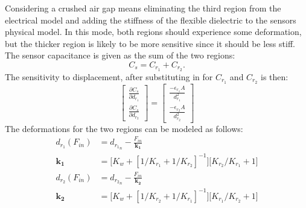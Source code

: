 Considering a crushed air gap means eliminating the third region from the electrical model
and adding the stiffness of the flexible dielectric to the sensors physical model.
In this mode, both regions should experience some deformation, but the thicker region is likely
to be more sensitive since it should be less stiff. 
The sensor capacitance is given as the sum of the two regions:
\begin{equation}
C_s = C_{r_1} + C_{r_2}.
\end{equation}
The sensitivity to displacement, after substituting in for $C_{r_1}$ and $C_{r_2}$ is then:
\begin{equation}
\begin{bmatrix}
\frac{\partial C_s}{\partial d_{r_1}} \\[1em]
\frac{\partial C_s}{\partial d_{r_2}} \end{bmatrix} = 
\begin{bmatrix}
\frac{-\epsilon_{r_1} A}{d_{r_1}^2} \\[1em]
\frac{-\epsilon_{r_2} A}{d_{r_2}^2}
\end{bmatrix}
\label{eq:ags}
\end{equation}
The deformations for the two regions can be modeled as follows:
\begin{align}
d_{r_1}(F_{in}) &= d_{{r_1}_n} - \frac{F_{in}}{\mathbf{k_1}} \\
\mathbf{k_1} &= \bigg[K_w + [1/K_{r_1} + 1/K_{r_2}]^{-1}\bigg]\bigg[K_{r_2} / K_{r_1} + 1\bigg]
\end{align}
\begin{align}
d_{r_2}(F_{in}) &= d_{{r_2}_n} - \frac{F_{in}}{\mathbf{k_2}} \\
\mathbf{k_2} &= \bigg[K_w + [1/K_{r_2} + 1/K_{r_1}]^{-1}\bigg]\bigg[K_{r_1} / K_{r_2} + 1\bigg]
\end{align}



